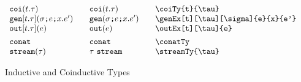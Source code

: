 \documentclass[11pt]{article}
\begin{document}
\begin{figure}
\begin{small}
\begin{displaymath}
\begin{array}{l@{\qquad}l@{\qquad}l@{\qquad}l}
        \coiTy{t}{\tau}                      & \coiTy*{t}{\tau}               & \verb|\coiTy{t}{\tau}|                         \\
        \genEx[t][\tau][\sigma]{e}{x}{e'}    & \genEx*[t][\tau][\sigma]{e}{x}{e'}   & \verb|\genEx[t][\tau][\sigma]{e}{x}{e'}|       \\
        \outEx[t][\tau]{e}                   & \outEx*{e}                          & \verb|\outEx[t][\tau]{e}|                      \\[1ex]

        \conatTy                             & \conatTy*                           & \verb|\conatTy|                                \\
        \streamTy{\tau}                      & \streamTy*{\tau}                    & \verb|\streamTy{\tau}|
      \end{array}
    \end{displaymath}
  \end{small}

  \caption{Inductive and Coinductive Types}
  \label{fig:icoi}
\end{figure}
\end{document}
